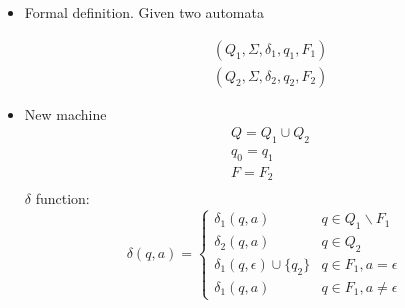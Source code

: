 \begin{frame}[allowframebreaks]
\begin{center}
\end{center}


  \begin{itemize}

\item Formal definition. Given two automata

  \begin{equation*}
    \begin{split}
&(Q_1, \Sigma, \delta_1, q_1, F_1) \\
&(Q_2, \Sigma, \delta_2, q_2, F_2)
\end{split}
\end{equation*}

\item New machine
  \begin{equation*}
    \begin{split}
& Q=Q_1\cup Q_2 \\
& q_0 = q_1 \\
& F=F_2 \\
\end{split}
\end{equation*}
$\delta$ function:
\begin{equation*}
  \delta(q,a)=
  \begin{cases}
    \delta_1(q,a) & q \in Q_1\backslash F_1\\
\delta_2(q,a) & q \in Q_2\\
\delta_1(q,\epsilon) \cup \{q_2\} & q \in F_1, a =\epsilon\\
\delta_1(q,a) & q \in F_1, a \neq \epsilon
  \end{cases}
\end{equation*}
\end{itemize}
\end{frame}

